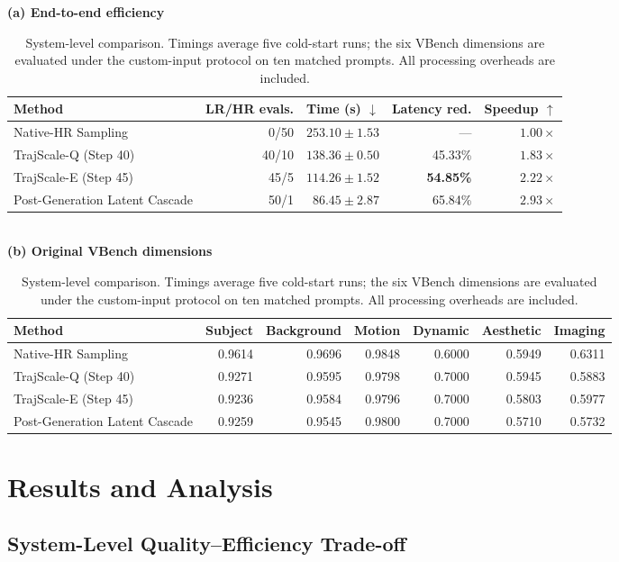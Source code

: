 \begin{table}[!t]
\centering
\footnotesize
\setlength{\tabcolsep}{5pt}
\textbf{(a) End-to-end efficiency}\\[2pt]
\begin{tabular}{lrrrr}
\toprule
Method & LR/HR evals. & Time (s) $\downarrow$ & Latency red. &
Speedup $\uparrow$ \\
\midrule
Native-HR Sampling & 0/50 & $253.10\pm1.53$ & --- &
$1.00\times$ \\
TrajScale-Q (Step 40) & 40/10 & $138.36\pm0.50$ & 45.33\% &
$1.83\times$ \\
TrajScale-E (Step 45) & 45/5 & $\mathbf{114.26\pm1.52}$ &
\textbf{54.85\%} & $\mathbf{2.22\times}$ \\
Post-Generation Latent Cascade & 50/1 & $86.45\pm2.87$ & 65.84\% &
$2.93\times$ \\
\bottomrule
\end{tabular}
\\[5pt]
\textbf{(b) Original VBench dimensions}\\[2pt]
\setlength{\tabcolsep}{3.2pt}
\begin{tabular}{lrrrrrr}
\toprule
Method & Subject & Background & Motion & Dynamic & Aesthetic & Imaging \\
\midrule
Native-HR Sampling & 0.9614 & 0.9696 & 0.9848 & 0.6000 & 0.5949 & 0.6311 \\
TrajScale-Q (Step 40) & 0.9271 & 0.9595 & 0.9798 & 0.7000 & 0.5945 & 0.5883 \\
TrajScale-E (Step 45) & 0.9236 & 0.9584 & 0.9796 & 0.7000 & 0.5803 & 0.5977 \\
Post-Generation Latent Cascade & 0.9259 & 0.9545 & 0.9800 & 0.7000 & 0.5710 & 0.5732 \\
\bottomrule
\end{tabular}
\caption{System-level comparison. Timings average five cold-start runs; the
six VBench dimensions are evaluated under the custom-input protocol on ten
matched prompts. All processing overheads are included.}
\label{tab:system}
\end{table}

\section{Results and Analysis}

\subsection{System-Level Quality--Efficiency Trade-off}

